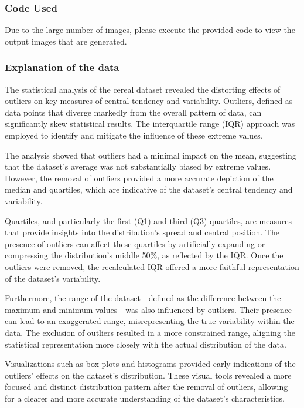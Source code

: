 \documentclass[a4paper, 10pt]{article}
\begin{document}
            \subsubsection{Code Used}
                \begin{quicknote}
                    Due to the large number of images, please execute the provided code to view the output images that are generated.
                \end{quicknote}

                
            \subsubsection{Explanation of the data}
                The statistical analysis of the cereal dataset revealed the distorting effects of outliers on key measures of central tendency and variability. Outliers, defined as data points that diverge markedly from the overall pattern of data, can significantly skew statistical results. The interquartile range (IQR) approach was employed to identify and mitigate the influence of these extreme values.

                The analysis showed that outliers had a minimal impact on the mean, suggesting that the dataset's average was not substantially biased by extreme values. However, the removal of outliers provided a more accurate depiction of the median and quartiles, which are indicative of the dataset's central tendency and variability.

                Quartiles, and particularly the first (Q1) and third (Q3) quartiles, are measures that provide insights into the distribution's spread and central position. The presence of outliers can affect these quartiles by artificially expanding or compressing the distribution's middle 50\%, as reflected by the IQR. Once the outliers were removed, the recalculated IQR offered a more faithful representation of the dataset's variability.

                Furthermore, the range of the dataset—defined as the difference between the maximum and minimum values—was also influenced by outliers. Their presence can lead to an exaggerated range, misrepresenting the true variability within the data. The exclusion of outliers resulted in a more constrained range, aligning the statistical representation more closely with the actual distribution of the data.

                Visualizations such as box plots and histograms provided early indications of the outliers' effects on the dataset's distribution. These visual tools revealed a more focused and distinct distribution pattern after the removal of outliers, allowing for a clearer and more accurate understanding of the dataset's characteristics.
\end{document}
